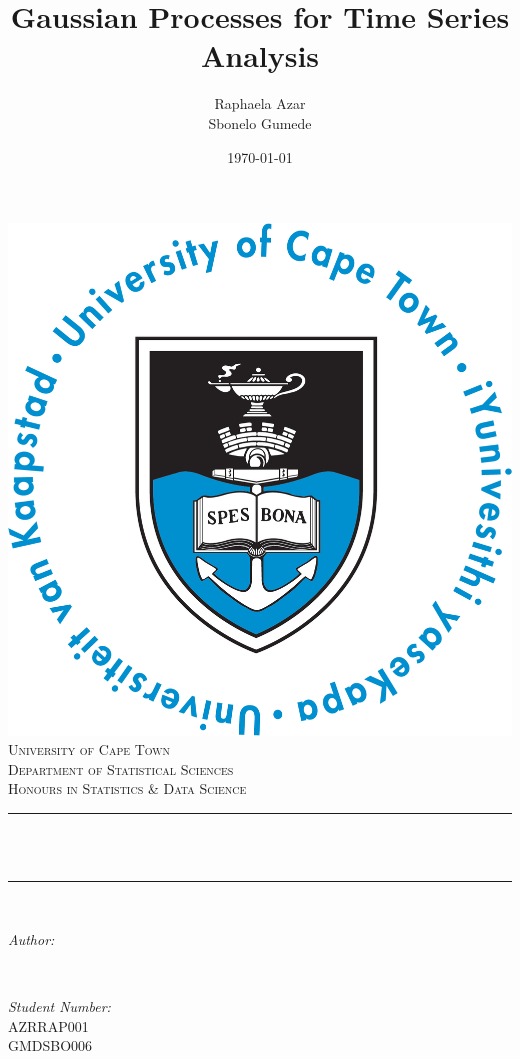 \documentclass{article}
\title{Gaussian Processes for Time Series Analysis}
\author{Raphaela Azar\\
        Sbonelo Gumede}
\date{\today}
\makeatletter
\let\thetitle\@title
\let\theauthor\@author
\let\thedate\@date
\makeatother
\begin{document}
   \begin{titlepage}
      \centering
      \includegraphics[scale = 0.38]{../images/UCT_logo.png}\\[0.8 cm]
      \textsc{\LARGE University of Cape Town}\\[1.5 cm]
      \textsc{\Large Department of Statistical Sciences}\\[0.5 cm]	
      \textsc{\large Honours in Statistics \& Data Science}\\[1 cm]
      \rule{\linewidth}{0.2 mm} \\[0.3 cm]
      \LARGE \textbf{\thetitle}\\
      \rule{\linewidth}{0.2 mm} \\[1 cm]
      
      \begin{minipage}{0.4\textwidth}
         \begin{flushleft} \large
            \emph{Author:}\\
            \theauthor
         \end{flushleft}
      \end{minipage}~
      \begin{minipage}{0.4\textwidth}
         \begin{flushright} \large
            \emph{Student Number:} \\
            AZRRAP001\\ 
            GMDSBO006
         \end{flushright}
      \end{minipage}\\[3 cm]
      \large
      \thedate\\
      \vfill
   \end{titlepage}
\end{document}
